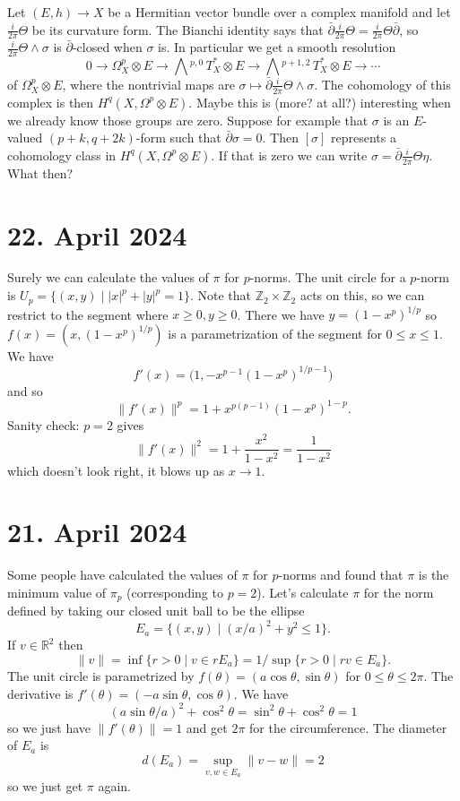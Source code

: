 \documentclass[11pt]{amsart}
\theoremstyle{definition}
\newcommand{\kk}[1]{\mathbb{#1}}
\newcommand{\ext}[1]{\bigwedge{}^{\!\!#1}\,}
\def\curv{\frac i{2\pi}\Theta}
\begin{document}
Let $(E,h) \to X$ be a Hermitian vector bundle over a complex manifold and let
$\frac i{2\pi}\Theta$ be its curvature form.
The Bianchi identity says that $\bar\partial  \curv = \curv \bar\partial$, so
$\curv \wedge \sigma$ is $\bar\partial$-closed when $\sigma$ is.
In particular we get a smooth resolution
$$
0 \to \Omega^p_X \otimes E
\to \ext{p,0} T_X^* \otimes E
\to \ext{p+1,2} T_X^* \otimes E
\to \cdots
$$
of $\Omega^p_X \otimes E$, where the nontrivial maps are 
$\sigma \mapsto \bar\partial\curv \wedge \sigma$.
The cohomology of this complex is then $H^q(X, \Omega^p \otimes E)$.
Maybe this is (more? at all?) interesting when we already know those groups are
zero.
Suppose for example that $\sigma$ is an $E$-valued $(p+k, q+2k)$-form such that
$\bar\partial \sigma = 0$. Then $[\sigma]$ represents a cohomology class in $H^q(X, \Omega^p \otimes E)$.
If that is zero we can write $\sigma = \bar\partial\curv \eta$.
What then?


\section{22. April 2024}

Surely we can calculate the values of $\pi$ for $p$-norms.
The unit circle for a $p$-norm is $U_p = \{ (x,y) \mid |x|^p + |y|^p = 1\}$.
Note that $\kk Z_2 \times \kk Z_2$ acts on this, so we can restrict to the
segment where $x \geq 0, y \geq 0$.
There we have $y = (1 - x^p)^{1/p}$ so $f(x) = (x, (1-x^p)^{1/p})$ is a
parametrization of the segment for $0 \leq x \leq 1$.
We have
$$
f'(x)
= \bigl( 1, -x^{p-1} (1-x^p)^{1/p-1} \bigr)
$$
and so
$$
\| f'(x) \|^p
= 1 + x^{p(p-1)} (1-x^p)^{1-p}.
$$
Sanity check: $p = 2$ gives
$$
\|f'(x)\|^2
= 1 + \frac{x^2}{1-x^2}
= \frac{1}{1-x^2}
$$
which doesn't look right, it blows up as $x \to 1$.


\section{21. April 2024}

Some people have calculated the values of $\pi$ for $p$-norms and found that
$\pi$ is the minimum value of $\pi_p$ (corresponding to $p = 2$).
Let's calculate $\pi$ for the norm defined by taking our closed unit ball to be
the ellipse
$$
E_a = \{ (x,y) \mid (x/a)^2 + y^2 \leq 1 \}.
$$
If $v \in \kk R^2$ then 
$$
\| v \| 
= \inf \{ r > 0 \mid v \in r E_a \}
= 1 / \sup \{ r > 0 \mid rv \in E_a \}.
$$
The unit circle is parametrized by $f(\theta) = (a\cos \theta, \sin \theta)$
for $0 \leq \theta \leq 2\pi$.
The derivative is $f'(\theta) = (-a\sin\theta, \cos\theta)$.
We have
$$
(a \sin\theta/a)^2 + \cos^2 \theta
= \sin^2 \theta + \cos^2 \theta = 1
$$
so we just have $\|f'(\theta)\| = 1$ and get $2\pi$ for the circumference.
The diameter of $E_a$ is
$$
d(E_a) = \sup_{v,w \in E_a} \| v - w \| = 2
$$
so we just get $\pi$ again.
\end{document}
